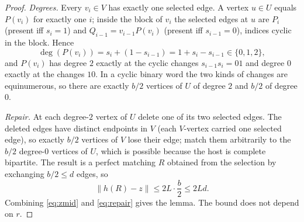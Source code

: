\documentclass[11pt,a4paper]{article}
\theoremstyle{plain}
\theoremstyle{definition}
\theoremstyle{remark}
\begin{document}
\begin{proof}
\emph{Degrees.} Every $v_i\in V$ has exactly one selected edge. A vertex $u\in U$ equals $P(v_i)$ for exactly one $i$; inside the block of $v_i$ the selected edges at $u$ are $P_i$ (present iff $s_i=1$) and $Q_{i-1}=v_{i-1}P(v_i)$ (present iff $s_{i-1}=0$), indices cyclic in the block. Hence
\[
 \deg(P(v_i))=s_i+(1-s_{i-1})=1+s_i-s_{i-1}\in\{0,1,2\},
\]
and $P(v_i)$ has degree $2$ exactly at the cyclic changes $s_{i-1}s_i=01$ and degree $0$ exactly at the changes $10$. In a cyclic binary word the two kinds of changes are equinumerous, so there are exactly $b/2$ vertices of $U$ of degree $2$ and $b/2$ of degree $0$.

\emph{Repair.} At each degree-$2$ vertex of $U$ delete one of its two selected edges. The deleted edges have distinct endpoints in $V$ (each $V$-vertex carried one selected edge), so exactly $b/2$ vertices of $V$ lose their edge; match them arbitrarily to the $b/2$ degree-$0$ vertices of $U$, which is possible because the host is complete bipartite. The result is a perfect matching $R$ obtained from the selection by exchanging $b/2\le d$ edges, so
\begin{equation}\label{eq:repair}
 \|h(R)-z\|\le 2L\cdot\frac b2\le 2Ld .
\end{equation}
Combining \eqref{eq:zmid} and \eqref{eq:repair} gives the lemma. The bound does not depend on $r$.
\end{proof}
\end{document}
